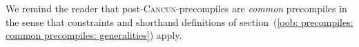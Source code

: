 We remind the reader that post-\textsc{Cancun}-precompiles are \emph{common} precompiles in the sense that constraints and shorthand definitions of
section~(\ref{oob: precompiles: common precompiles: generalities})
apply.
